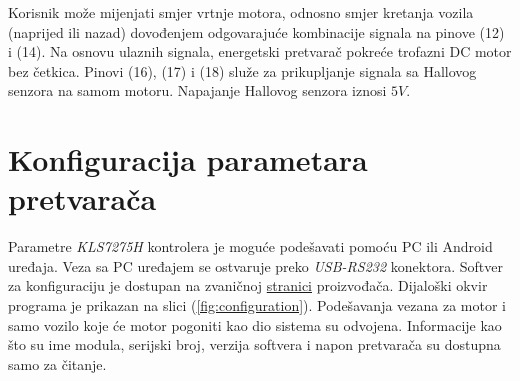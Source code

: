 Korisnik može mijenjati smjer vrtnje motora, odnosno smjer kretanja vozila (naprijed ili nazad) dovođenjem odgovarajuće kombinacije signala na pinove (12) i (14). Na osnovu ulaznih signala, energetski pretvarač pokreće trofazni DC motor bez četkica. Pinovi (16), (17) i (18) služe za prikupljanje signala sa Hallovog senzora na samom motoru. Napajanje Hallovog senzora iznosi $5V$.

\section{Konfiguracija parametara pretvarača}

\qquad Parametre \textit{KLS7275H} kontrolera je moguće podešavati pomoću PC ili Android uređaja. Veza sa PC uređajem se ostvaruje preko \textit{USB-RS232} konektora. Softver za konfiguraciju je dostupan na zvaničnoj \href{https://kellycontroller.com/shop/kls-h/}{stranici} proizvođača. Dijaloški okvir programa je prikazan na slici (\ref{fig:configuration}). Podešavanja vezana za motor i samo vozilo koje će motor pogoniti kao dio sistema su odvojena. Informacije kao što su ime modula, serijski broj, verzija softvera i napon pretvarača su dostupna samo za čitanje.


